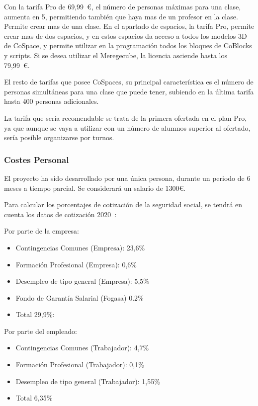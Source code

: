 Con la tarifa Pro de 69,99~\euro{}, el número de personas máximas para una clase, aumenta en 5, permitiendo también que haya mas de un profesor en la clase. Permite crear mas de una clase. En el apartado de espacios, la tarifa Pro, permite crear mas de dos espacios, y en estos espacios da acceso a todos los modelos 3D de CoSpace, y permite utilizar en la programación todos los bloques de CoBlocks y scripts.
Si se desea utilizar el Meregecube, la licencia asciende hasta los 79,99~\euro{}. 

El resto de tarifas que posee CoSpaces, su principal característica es el número de personas simultáneas para una clase que puede tener, subiendo en la última tarifa hasta 400 personas adicionales.

La tarifa que sería recomendable se trata de la primera ofertada en el plan Pro, ya que aunque se vaya a utilizar con un número de alumnos superior al ofertado, sería posible organizarse por turnos.

\subsubsection{Costes Personal}
El proyecto ha sido desarrollado por una única persona, durante un periodo de 6 meses a tiempo parcial. Se considerará un salario de 1300\euro.

Para calcular los porcentajes de cotización de la seguridad social, se tendrá en cuenta los datos de cotización 2020~\cite{contingencias2020}:

Por parte de la empresa:
\begin{itemize}
	\item Contingencias Comunes (Empresa): 23,6\%
	\item Formación Profesional (Empresa): 0,6\%
	\item Desempleo de tipo general (Empresa): 5,5\%
	\item Fondo de Garantía Salarial (Fogasa) 0.2\%
	\item Total 29,9\%:
\end{itemize}

Por parte del empleado:
\begin{itemize}
	\item Contingencias Comunes (Trabajador): 4,7\%	
	\item Formación Profesional (Trabajador): 0,1\%
	\item Desempleo de tipo general (Trabajador): 1,55\%
	\item Total 6,35\%
\end{itemize}


